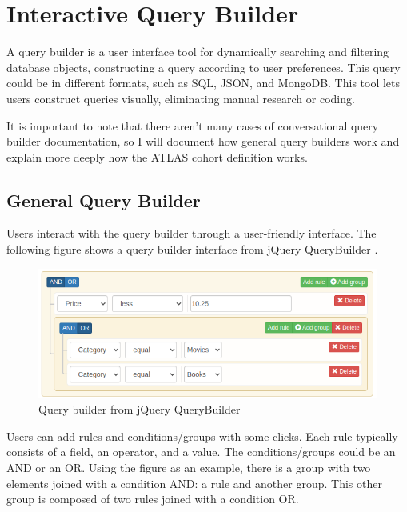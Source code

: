 

\section{Interactive Query Builder}

A query builder is a user interface tool for dynamically searching and filtering database objects, constructing a query according to user preferences. This query could be in different formats, such as SQL, JSON, and MongoDB. This tool lets users construct queries visually, eliminating manual research or coding. 

It is important to note that there aren't many cases of conversational query builder documentation, so I will document how general query builders work and explain more deeply how the ATLAS cohort definition works. 


\subsection{General Query Builder}


Users interact with the query builder through a user-friendly interface. The following figure shows a query builder interface from jQuery QueryBuilder \cite{noauthor_jquery_nodate}.

\begin{figure}[ht]
    \includegraphics[width=14cm]{figs/chapter2/querybuilder.png}
    \centering
    \caption{Query builder from jQuery QueryBuilder \cite{noauthor_jquery_nodate}}
\end{figure}

Users can add rules and conditions/groups with some clicks. Each rule typically consists of a field, an operator, and a value. The conditions/groups could be an AND or an OR. Using the figure as an example, there is a group with two elements joined with a condition AND: a rule and another group. This other group is composed of two rules joined with a condition OR.

